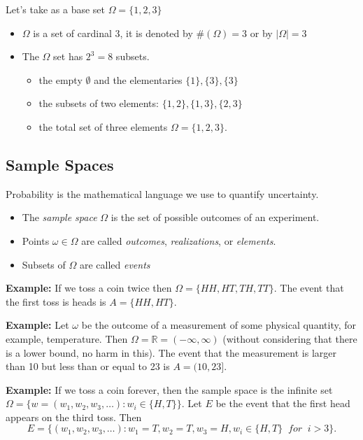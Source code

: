 \documentclass[
]{book}
\providecommand{\tightlist}{%
  \setlength{\itemsep}{0pt}\setlength{\parskip}{0pt}}
\theoremstyle{definition}
\theoremstyle{definition}
\theoremstyle{definition}
\theoremstyle{definition}
\theoremstyle{remark}
\begin{document}
Let's take as a base set \(\Omega=\{1,2,3\}\)

\begin{itemize}
\tightlist
\item
  \(\Omega\) is a set of cardinal 3, it is denoted by \(\#(\Omega)=3\) or by \(|\Omega|=3\)
\item
  The \(\Omega\) set has \(2^3=8\) subsets.

  \begin{itemize}
  \tightlist
  \item
    the empty \(\emptyset\) and the elementaries \(\{1\},\{3\},\{3\}\)
  \item
    the subsets of two elements: \(\{1,2\},\{1,3\},\{2,3\}\)
  \item
    the total set of three elements \(\Omega=\{1,2,3\}.\)
  \end{itemize}
\end{itemize}

\hypertarget{sample-spaces}{%
\subsection{Sample Spaces}\label{sample-spaces}}

Probability is the mathematical language we use to quantify uncertainty.

\begin{itemize}
\tightlist
\item
  The \emph{sample space} \(\Omega\) is the set of possible outcomes of an experiment.
\item
  Points \(\omega\in\Omega\) are called \emph{outcomes}, \emph{realizations}, or \emph{elements}.
\item
  Subsets of \(\Omega\) are called \emph{events}
\end{itemize}

\textbf{Example:} If we toss a coin twice then \(\Omega =\{ HH, HT, TH, TT\}\). The event that the first toss is heads is \(A=\{HH,HT\}\).

\textbf{Example:} Let \(\omega\) be the outcome of a measurement of some physical quantity, for example, temperature. Then \(\Omega=\mathbb{R}=(-\infty,\infty)\) (without considering that there is a lower bound, no harm in this). The event that the measurement is larger than 10 but less than or equal to 23 is \(A=(10,23]\).

\textbf{Example:} If we toss a coin forever, then the sample space is the infinite set \(\Omega = \{w=(w_1,w_2,w_3,\dots): w_i\in\{H,T\}\}\). Let \(E\) be the event that the first head appears on the third toss. Then
\[
E=\{(w_1,w_2,w_3,\dots):w_1=T,w_2=T,w_3=H,w_i\in\{H,T\}\;\; for\;\; i>3\}.
\]
\end{document}
